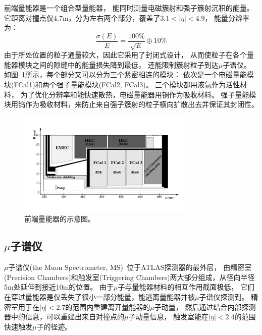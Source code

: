 前端量能器是一个组合型量能器，
能同时测量电磁簇射和强子簇射沉积的能量。
它距离对撞点仅4.7m，分为左右两个部分，覆盖了$3.1<|\eta|<4.9$，
能量分辨率为：
\begin{equation} 
\label{eq:EMsigma3}
\frac{\sigma(E)}{E}=\frac{100\%}{\sqrt{E}}\oplus 10\%
\end{equation}
由于所处位置的粒子通量较大，因此它采用了封闭式设计，
从而使粒子在各个量能器模块之间的隙缝中的能量损失降到最低，
还能限制簇射粒子到达$\mu$子谱仪。
如图~\ref{fig:ATLASCA5}所示，每个部分又可以分为三个紧密相连的模块：
依次是一个电磁量能模块(FCal1)和两个强子量能模块(FCal2, FCal3)。
三个模块都用液氩作为活性材料，
为了优化分辨率和能快速散热，电磁量能器用铜作为吸收材料。
强子量能模块用钨作为吸收材料，来防止来自强子簇射的粒子横向扩散出去并保证其封闭性。

\begin{figure}
  \begin{center}
    \includegraphics[width=0.75\textwidth]{figuresEXP/ATLASCA5.jpg}
  \end{center}
  \caption{
前端量能器的示意图。
  }
    \label{fig:ATLASCA5}
\end{figure}





\subsection{$\mu$子谱仪}
\label{sec:ATLASMS}

$\mu$子谱仪(the Muon Spectrometer, MS)~\cite{ATLASMUSPEC}位于ATLAS探测器的最外层，
由精密室(Precision Chambers)和触发室(Triggering Chambers)两大部分组成，从径向半径5m处延伸到接近10m的位置。
由于$\mu$子与量能器材料的相互作用截面极低，
它们在穿过量能器是仅丢失了很小一部分能量，能逃离量能器并被$\mu$子谱仪探测到。
精密室用于在$|\eta|<2.7$的范围内重建离开量能器的$\mu$子动量，
然后通过结合内部探测器中的信息，可以重建出来自对撞点的$\mu$子动量信息，
触发室能在$|\eta|<2.4$的范围快速触发$\mu$子的径迹。

